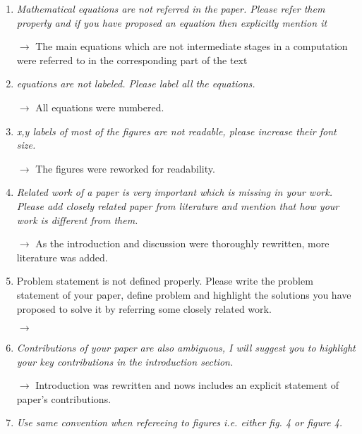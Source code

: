 \documentclass[11pt,a4paper,sans]{moderncv}        %
\begin{document}
\begin{enumerate}
	\item \textit{Mathematical equations are not referred in the paper. Please refer them properly and if you have proposed an equation then explicitly mention it}
	
	$\rightarrow$ The main equations which are not intermediate stages in a computation were referred to in the corresponding part of the text
	
	\medskip
	
	\item \textit{equations are not labeled. Please label all the equations.}
	
	$\rightarrow$ All equations were numbered.
	
	\medskip
	
	\item \textit{x,y labels of most of the figures are not readable, please increase their font size.}
	
	$\rightarrow$ The figures were reworked for readability.
	
	\medskip
	
	\item \textit{Related work of a paper is very important which is missing in your work. Please add closely related paper from literature and mention that how your work is different from them.}

	$\rightarrow$ As the introduction and discussion were thoroughly rewritten, more literature was added.

	\medskip

	\item Problem statement is not defined properly. Please write the problem statement of your paper, define problem and highlight the solutions you have proposed to solve it by referring some closely related work. 
	
	$\rightarrow$ 
	
	\medskip
	
	\item \textit{Contributions of your paper are also ambiguous, I will suggest you to highlight your key contributions in the introduction section.}
	
	$\rightarrow$ Introduction was rewritten and nows includes an explicit statement of paper's contributions.
	
	\medskip

	\item \textit{Use same convention when refereeing to figures i.e. either fig. 4 or figure 4.}
	

\end{enumerate}
\end{document}
